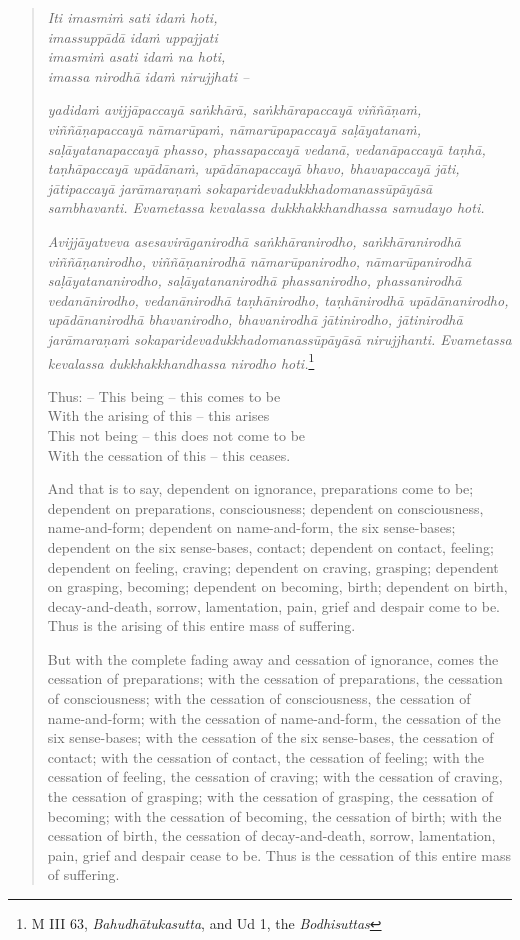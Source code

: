 \begin{quote}
\emph{Iti imasmiṁ sati idaṁ hoti,}\\
\emph{imassuppādā idaṁ uppajjati}\\
\emph{imasmiṁ asati idaṁ na hoti,}\\
\emph{imassa nirodhā idaṁ nirujjhati --}

\emph{yadidaṁ avijjāpaccayā saṅkhārā, saṅkhārapaccayā viññāṇaṁ, viññāṇapaccayā nāmarūpaṁ, nāmarūpapaccayā saḷāyatanaṁ, saḷāyatanapaccayā phasso, phassapaccayā vedanā, vedanāpaccayā taṇhā, taṇhāpaccayā upādānaṁ, upādānapaccayā bhavo, bhavapaccayā jāti, jātipaccayā jarāmaraṇaṁ sokaparidevadukkhadomanassūpāyāsā sambhavanti. Evametassa kevalassa dukkhakkhandhassa samudayo hoti.}

\emph{Avijjāyatveva asesavirāganirodhā saṅkhāranirodho, saṅkhāranirodhā viññāṇanirodho, viññāṇanirodhā nāmarūpanirodho, nāmarūpanirodhā saḷāyatananirodho, saḷāyatananirodhā phassanirodho, phassanirodhā vedanānirodho, vedanānirodhā taṇhānirodho, taṇhānirodhā upādānanirodho, upādānanirodhā bhavanirodho, bhavanirodhā jātinirodho, jātinirodhā jarāmaraṇaṁ sokaparidevadukkhadomanassūpāyāsā nirujjhanti. Evametassa kevalassa dukkhakkhandhassa nirodho hoti.}\footnote{M III 63, \emph{Bahudhātukasutta}, and Ud 1, the \emph{Bodhisuttas}}

Thus: -- This being -- this comes to be\\
With the arising of this -- this arises\\
This not being -- this does not come to be\\
With the cessation of this -- this ceases.

And that is to say, dependent on ignorance, preparations come to be; dependent on preparations, consciousness; dependent on consciousness, name-and-form; dependent on name-and-form, the six sense-bases; dependent on the six sense-bases, contact; dependent on contact, feeling; dependent on feeling, craving; dependent on craving, grasping; dependent on grasping, becoming; dependent on becoming, birth; dependent on birth, decay-and-death, sorrow, lamentation, pain, grief and despair come to be. Thus is the arising of this entire mass of suffering.

But with the complete fading away and cessation of ignorance, comes the cessation of preparations; with the cessation of preparations, the cessation of consciousness; with the cessation of consciousness, the cessation of name-and-form; with the cessation of name-and-form, the cessation of the six sense-bases; with the cessation of the six sense-bases, the cessation of contact; with the cessation of contact, the cessation of feeling; with the cessation of feeling, the cessation of craving; with the cessation of craving, the cessation of grasping; with the cessation of grasping, the cessation of becoming; with the cessation of becoming, the cessation of birth; with the cessation of birth, the cessation of decay-and-death, sorrow, lamentation, pain, grief and despair cease to be. Thus is the cessation of this entire mass of suffering.
\end{quote}

